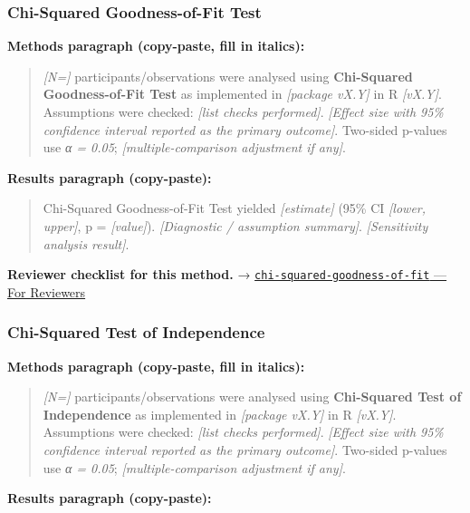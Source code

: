 \documentclass[
]{article}
\begin{document}
\subsubsection{Chi-Squared Goodness-of-Fit
Test}\label{chi-squared-goodness-of-fit-test}

\textbf{Methods paragraph (copy-paste, fill in italics):}

\begin{quote}
\emph{{[}N={]}} participants/observations were analysed using
\textbf{Chi-Squared Goodness-of-Fit Test} as implemented in
\emph{{[}package vX.Y{]}} in R \emph{{[}vX.Y{]}}. Assumptions were
checked: \emph{{[}list checks performed{]}}. \emph{{[}Effect size with
95\% confidence interval reported as the primary outcome{]}}. Two-sided
p-values use \emph{α = 0.05}; \emph{{[}multiple-comparison adjustment if
any{]}}.
\end{quote}

\textbf{Results paragraph (copy-paste):}

\begin{quote}
Chi-Squared Goodness-of-Fit Test yielded \emph{{[}estimate{]}} (95\% CI
\emph{{[}lower, upper{]}}, p = \emph{{[}value{]}}). \emph{{[}Diagnostic
/ assumption summary{]}}. \emph{{[}Sensitivity analysis result{]}}.
\end{quote}

\textbf{Reviewer checklist for this method.} →
\href{../chapters/04-inferential/chi-squared-goodness-of-fit.Rmd\#for-reviewers}{\texttt{chi-squared-goodness-of-fit}
--- For Reviewers}

\subsubsection{Chi-Squared Test of
Independence}\label{chi-squared-test-of-independence}

\textbf{Methods paragraph (copy-paste, fill in italics):}

\begin{quote}
\emph{{[}N={]}} participants/observations were analysed using
\textbf{Chi-Squared Test of Independence} as implemented in
\emph{{[}package vX.Y{]}} in R \emph{{[}vX.Y{]}}. Assumptions were
checked: \emph{{[}list checks performed{]}}. \emph{{[}Effect size with
95\% confidence interval reported as the primary outcome{]}}. Two-sided
p-values use \emph{α = 0.05}; \emph{{[}multiple-comparison adjustment if
any{]}}.
\end{quote}

\textbf{Results paragraph (copy-paste):}
\end{document}
